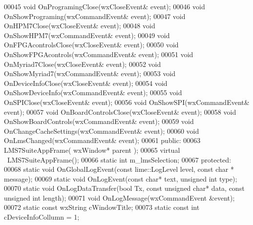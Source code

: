 \begin{DoxyCode}
00045         \textcolor{keywordtype}{void} OnProgramingClose(wxCloseEvent& event);
00046         \textcolor{keywordtype}{void} OnShowPrograming(wxCommandEvent& event);
00047         \textcolor{keywordtype}{void} OnHPM7Close(wxCloseEvent& event);
00048         \textcolor{keywordtype}{void} OnShowHPM7(wxCommandEvent& event);
00049         \textcolor{keywordtype}{void} OnFPGAcontrolsClose(wxCloseEvent& event);
00050         \textcolor{keywordtype}{void} OnShowFPGAcontrols(wxCommandEvent& event);
00051         \textcolor{keywordtype}{void} OnMyriad7Close(wxCloseEvent& event);
00052         \textcolor{keywordtype}{void} OnShowMyriad7(wxCommandEvent& event);
00053         \textcolor{keywordtype}{void} OnDeviceInfoClose(wxCloseEvent& event);
00054         \textcolor{keywordtype}{void} OnShowDeviceInfo(wxCommandEvent& event);
00055         \textcolor{keywordtype}{void} OnSPIClose(wxCloseEvent& event);
00056         \textcolor{keywordtype}{void} OnShowSPI(wxCommandEvent& event);
00057         \textcolor{keywordtype}{void} OnBoardControlsClose(wxCloseEvent& event);
00058         \textcolor{keywordtype}{void} OnShowBoardControls(wxCommandEvent& event);
00059         \textcolor{keywordtype}{void} OnChangeCacheSettings(wxCommandEvent& event);
00060         \textcolor{keywordtype}{void} OnLmsChanged(wxCommandEvent& event);
00061     \textcolor{keyword}{public}:
00063         LMS7SuiteAppFrame( wxWindow* parent );
00065         \textcolor{keyword}{virtual} ~LMS7SuiteAppFrame();
00066         \textcolor{keyword}{static} \textcolor{keywordtype}{int} m_lmsSelection;
00067 \textcolor{keyword}{protected}:
00068         \textcolor{keyword}{static} \textcolor{keywordtype}{void} OnGlobalLogEvent(\textcolor{keyword}{const} lime::LogLevel level, \textcolor{keyword}{const} \textcolor{keywordtype}{char} *
      message);
00069         \textcolor{keyword}{static} \textcolor{keywordtype}{void} OnLogEvent(\textcolor{keyword}{const} \textcolor{keywordtype}{char}* text, \textcolor{keywordtype}{unsigned} \textcolor{keywordtype}{int} type);
00070         \textcolor{keyword}{static} \textcolor{keywordtype}{void} OnLogDataTransfer(\textcolor{keywordtype}{bool} Tx, \textcolor{keyword}{const} \textcolor{keywordtype}{unsigned} \textcolor{keywordtype}{char}* data, \textcolor{keyword}{const} \textcolor{keywordtype}{unsigned} \textcolor{keywordtype}{int} 
      length);
00071         \textcolor{keywordtype}{void} OnLogMessage(wxCommandEvent &event);
00072         \textcolor{keyword}{static} \textcolor{keyword}{const} wxString cWindowTitle;
00073         \textcolor{keyword}{static} \textcolor{keyword}{const} \textcolor{keywordtype}{int} cDeviceInfoCollumn = 1;

\end{DoxyCode}
